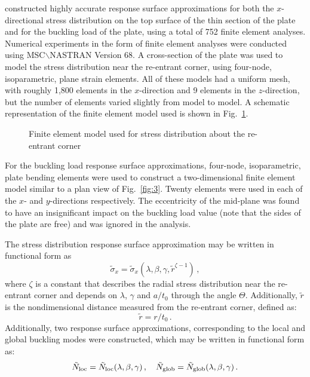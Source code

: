 \documentclass[stropt]{svjour}
\begin{document}
\leavevmode\cite{Venter97}
constructed highly accurate response surface
approximations for both the $x$-directional stress distribution on the top
surface of the thin section of the plate and for the buckling load of the
plate, using a total of 752 finite element analyses.
Numerical experiments in the form of finite element analyses were conducted
using MSC$\backslash$NASTRAN Version 68.
A cross-section of the plate was used to model the stress distribution near
the re-entrant corner, using four-node, isoparametric, plane strain elements.
All of these models had a uniform mesh, with roughly 1,800 elements in the
$x$-direction and 9 elements in the $z$-direction, but the number of elements
varied slightly from model to model.
A schematic representation of the finite element model used is shown in
Fig.~\ref{fig:5}.

\begin{figure}
\vspace{5cm}
\caption{Finite element model used for stress distribution about the
re-entrant corner}
\label{fig:5}
\end{figure}

For the buckling load response surface approximations, four-node,
isoparametric, plate bending elements were used to construct a two-dimensional
finite element model similar to a plan view of Fig.~\ref{fig:3}.
Twenty elements were used in each of the $x$- and $y$-directions respectively.
The eccentricity of the mid-plane was found to have an insignificant impact on
the buckling load value (note that the sides of the plate are free) and was
ignored in the analysis.

The stress distribution response surface approximation
\citep[see][]{Venter97}
may be written in functional form as
\begin{equation}
\tilde{\sigma}_x=\tilde{\sigma}_x\left(\lambda,\beta,\gamma,
\tilde{r}^{\zeta-1}\right)\, ,
\label{eq22}
\end{equation}
where $\zeta$ is a constant that describes the radial stress distribution near
the re-entrant corner and depends on $\lambda$, $\gamma$ and $a/t_0$ through
the angle $\Theta$.
Additionally, $\tilde{r}$ is the nondimensional distance measured from the
re-entrant corner, defined as:
\begin{equation}
\tilde{r}=r/t_0\, .
\label{eq23}
\end{equation}
Additionally, two response surface approximations, corresponding to the local
and global buckling modes were constructed, which may be written in functional
form as:
\begin{equation}
\tilde{N}_{{\rm loc}}=\tilde{N}_{{\rm loc}}(\lambda,\beta,\gamma)\, ,
\quad
\tilde{N}_{{\rm glob}}=\tilde{N}_{{\rm glob}}(\lambda,\beta,\gamma)\, .
\label{eq24}
\end{equation}
\end{document}
